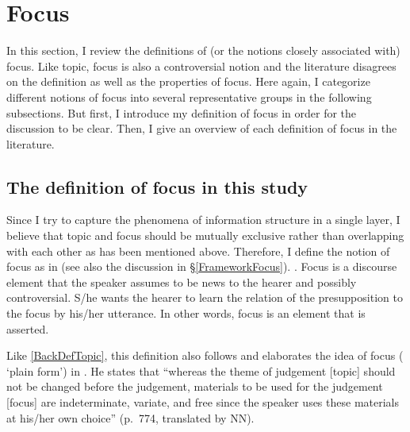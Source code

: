 

\section{Focus}\label{BackSecFocus}

In this section, I review the definitions of (or the notions closely associated with) focus.
Like topic, focus is also a controversial notion and the literature disagrees on the definition as well as the properties of focus.
Here again, I categorize different notions of focus into several representative groups in the following subsections.
But first, I introduce my definition of focus in order for the discussion to be clear.
Then, I give an overview of each definition of focus in the literature.

\subsection{The definition of focus in this study}\label{BackSubsecDefFocus}

Since I try to capture the phenomena of information structure in a single layer,
I believe that topic and focus should be mutually exclusive rather than overlapping with each other
as has been mentioned above.
Therefore, I define the notion of focus as in \Next
(see also the discussion in \S \ref{FrameworkFocus}).
%
\ex. Focus is a discourse element that the speaker assumes to be news to the hearer and possibly controversial.
S/he wants the hearer to learn the relation of the presupposition to the focus by his/her utterance.
In other words, focus is an element that is asserted.
\label{BackFocDef}

Like \ref{BackDefTopic},
this definition also follows and elaborates the idea of focus ( `plain form') in .
He states that ``whereas the theme of judgement [topic] should not be changed before the judgement, materials to be used for the judgement [focus] are indeterminate, variate, and free since the speaker uses these materials at his/her own choice'' (p.~774, translated by NN).


